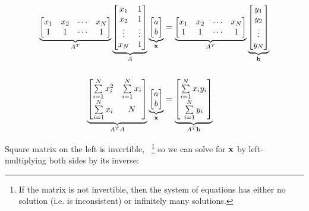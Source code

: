 \begin{problem}
\begin{enumroman}
\begin{answer}
        \begin{align*}
          \underbrace{\begin{bmatrix}
            x_1 & x_2 & \cdots & x_N \\
            1 & 1 & \cdots & 1
          \end{bmatrix}}_{A^T}
          \underbrace{\begin{bmatrix}
            x_1 & 1 \\
            x_2 & 1 \\
            \vdots & \vdots \\
            x_N & 1
          \end{bmatrix}}_{A}
          \underbrace{\begin{bmatrix}
            a \\
            b
          \end{bmatrix}}_{\mathbf{x}}
          &=
          \underbrace{\begin{bmatrix}
            x_1 & x_2 & \cdots & x_N \\
            1 & 1 & \cdots & 1
          \end{bmatrix}}_{A^T}
          \underbrace{\begin{bmatrix}
            y_1 \\
            y_2 \\
            \vdots \\
            y_N
          \end{bmatrix}}_{\mathbf{b}} \\ \\
          \underbrace{\begin{bmatrix}
            \sum\limits_{i=1}^N x_i^2 & \sum\limits_{i=1}^N x_i \\
            \sum\limits_{i=1}^N x_i & N
          \end{bmatrix}}_{A^T A}
          \underbrace{\begin{bmatrix}
            a \\
            b
          \end{bmatrix}}_{\mathbf{x}}
          &=
          \underbrace{\begin{bmatrix}
            \sum\limits_{i=1}^N x_i y_i \\
            \sum\limits_{i=1}^N y_i
          \end{bmatrix}}_{A^T \mathbf{b}}
        \end{align*}

        Square matrix on the left is invertible,
        ~\footnote{
          If the matrix is not invertible, then the system of equations
          has either no solution (i.e. is inconsistent)
          or infinitely many solutions.
        }
        so we can solve for $\mathbf{x}$ by left-multiplying both sides
        by its inverse:


\end{answer}
\end{enumroman}
\end{problem}
